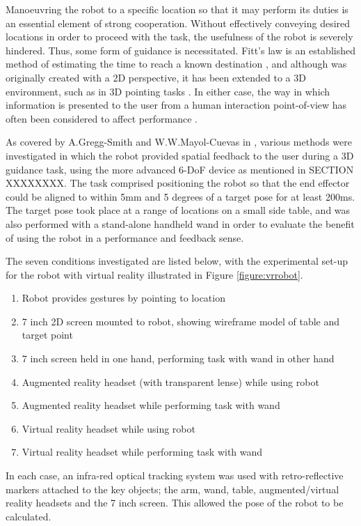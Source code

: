 \documentclass[11pt]{article}
\begin{document}
Manoeuvring the robot to a specific location so that it may perform its duties is an essential element of strong cooperation. Without effectively conveying desired locations in order to proceed with the task, the usefulness of the robot is severely hindered. Thus, some form of guidance is necessitated. Fitt's law is an established method of estimating the time to reach a known destination \cite{fitts1954}, and although was originally created with a 2D perspective, it has been extended to a 3D environment, such as in 3D pointing tasks \cite{Cha2013}. In either case, the way in which information is presented to the user from a human interaction point-of-view has often been considered to affect performance \cite{soukoreff2004} \cite{MOTOYUKI1995}. 
  
As covered by A.Gregg-Smith and W.W.Mayol-Cuevas in \cite{GreggSmithFeedback}, various methods were investigated in which the robot provided spatial feedback to the user during a 3D guidance task, using the more advanced 6-DoF device as mentioned in SECTION XXXXXXXX. The task comprised positioning the robot so that the end effector could be aligned to within 5mm and 5 degrees of a target pose for at least 200ms. The target pose took place at a range of locations on a small side table, and was also performed with a stand-alone handheld wand in order to evaluate the benefit of using the robot in a performance and feedback sense.

The seven conditions investigated are listed below, with the experimental set-up for the robot with virtual reality illustrated in Figure \ref{figure:vrrobot}.
\begin{enumerate}
\item{Robot provides gestures by pointing to location}
\item{7 inch 2D screen mounted to robot, showing wireframe model of table and target point}
\item{7 inch screen held in one hand, performing task with wand in other hand}
\item{Augmented reality headset (with transparent lense) while using robot}
\item{Augmented reality headset while performing task with wand}
\item{Virtual reality headset while using robot}
\item{Virtual reality headset while performing task with wand}
\end{enumerate}

In each case, an infra-red optical tracking system was used with retro-reflective markers attached to the key objects; the arm, wand, table, augmented/virtual reality headsets and the 7 inch screen. This allowed the pose of the robot to be calculated.
\end{document}
